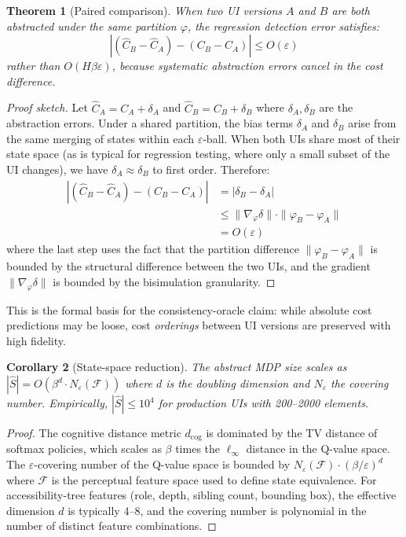 \documentclass[11pt,twocolumn]{article}
\newtheorem{theorem}{Theorem}
\newtheorem{corollary}[theorem]{Corollary}
\theoremstyle{definition}
\begin{document}
\begin{theorem}[Paired comparison]
\label{thm:paired}
When two UI versions $A$ and $B$ are both abstracted under the same partition $\varphi$, the regression detection error satisfies:
\begin{equation}
  |(\hat{C}_B - \hat{C}_A) - (C_B - C_A)| \leq O(\varepsilon)
\end{equation}
rather than $O(H\beta\varepsilon)$, because systematic abstraction errors cancel in the cost difference.
\end{theorem}

\begin{proof}[Proof sketch]
Let $\hat{C}_A = C_A + \delta_A$ and $\hat{C}_B = C_B + \delta_B$ where $\delta_A, \delta_B$ are the abstraction errors.
Under a shared partition, the bias terms $\delta_A$ and $\delta_B$ arise from the same merging of states within each $\varepsilon$-ball.
When both UIs share most of their state space (as is typical for regression testing, where only a small subset of the UI changes), we have $\delta_A \approx \delta_B$ to first order.
Therefore:
\begin{align*}
|(\hat{C}_B - \hat{C}_A) - (C_B - C_A)| &= |\delta_B - \delta_A| \\
&\leq \|\nabla_\varphi \delta\| \cdot \|\varphi_B - \varphi_A\| \\
&= O(\varepsilon)
\end{align*}
where the last step uses the fact that the partition difference $\|\varphi_B - \varphi_A\|$ is bounded by the structural difference between the two UIs, and the gradient $\|\nabla_\varphi \delta\|$ is bounded by the bisimulation granularity.
\end{proof}

This is the formal basis for the consistency-oracle claim: while absolute cost predictions may be loose, cost \emph{orderings} between UI versions are preserved with high fidelity.

\begin{corollary}[State-space reduction]
The abstract MDP size scales as $|\hat{S}| = O(\beta^d \cdot N_\varepsilon(\mathcal{F}))$ where $d$ is the doubling dimension and $N_\varepsilon$ the covering number. Empirically, $|\hat{S}| \leq 10^4$ for production UIs with 200--2000 elements.
\end{corollary}

\begin{proof}
The cognitive distance metric $d_\mathrm{cog}$ is dominated by the TV distance of softmax policies, which scales as $\beta$ times the $\ell_\infty$ distance in the Q-value space.
The $\varepsilon$-covering number of the Q-value space is bounded by $N_\varepsilon(\mathcal{F}) \cdot (\beta/\varepsilon)^d$ where $\mathcal{F}$ is the perceptual feature space used to define state equivalence.
For accessibility-tree features (role, depth, sibling count, bounding box), the effective dimension $d$ is typically 4--8, and the covering number is polynomial in the number of distinct feature combinations.
\end{proof}
\end{document}

